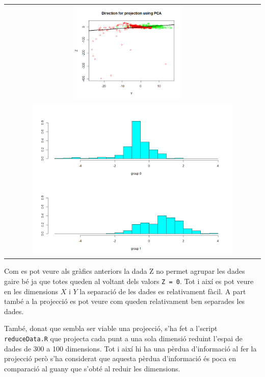 \documentclass[a4paper]{article}
\begin{document}
\begin{longtable}{cc}
	\includegraphics[width=0.45\textwidth]{images/PCA_YZ} \\
	\multicolumn{2}{c}{\includegraphics[width=0.8\textwidth]{images/FDA_results}}
\end{longtable}

Com es pot veure als gràfics anteriors la dada Z no permet agrupar les dades gaire bé ja que totes queden al voltant dels valors \verb|Z = 0|. Tot i així es pot veure en les dimensions $X$ i $Y$ la separació de les dades es relativament fàcil. A part també a la projecció es pot veure com queden relativament ben separades les dades.

També, donat que sembla ser viable una projecció, s'ha fet a l'script \texttt{reduceData.R} que projecta cada punt a una sola dimensió reduint l'espai de dades de 300 a 100 dimensions. Tot i així hi ha una pèrdua d'informació al fer la projecció però s'ha considerat que aquesta pèrdua d'informació és poca en comparació al guany que s'obté al reduir les dimensions.

\newpage
\end{document}
